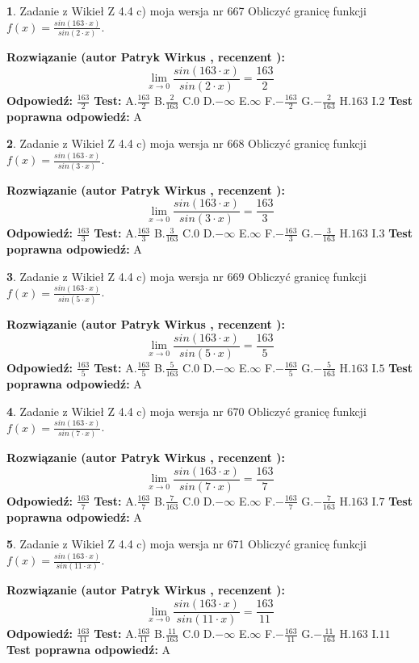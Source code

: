 \documentclass[12pt, a4paper]{article}
\theoremstyle{definition} %
\newtheorem{zad}{}
\newcommand{\zadStart}[1]{\begin{zad}#1\newline}
\newcommand{\zadStop}{\end{zad}}
\newcommand{\rozwStart}[2]{\noindent \textbf{Rozwiązanie (autor #1 , recenzent #2): }\newline}
\newcommand{\rozwStop}{\newline}
\newcommand{\odpStart}{\noindent \textbf{Odpowiedź:}\newline}
\newcommand{\odpStop}{\newline}
\newcommand{\testStart}{\noindent \textbf{Test:}\newline}
\newcommand{\testStop}{\newline}
\newcommand{\kluczStart}{\noindent \textbf{Test poprawna odpowiedź:}\newline}
\newcommand{\kluczStop}{\newline}
\begin{document}
\zadStart{Zadanie z Wikieł Z 4.4 c) moja wersja nr 667}
Obliczyć granicę funkcji $f(x)=\frac{sin(163\cdot x)}{sin(2\cdot x)}$.
\zadStop
\rozwStart{Patryk Wirkus}{}
$$\lim\limits_{x\to 0}\frac{sin(163\cdot x)}{sin(2\cdot x)}=
\frac{163}{2}$$
\rozwStop
\odpStart
$\frac{163}{2}$
\odpStop
\testStart
A.$\frac{163}{2}$
B.$\frac{2}{163}$
C.$0$
D.$-\infty$
E.$\infty$
F.$-\frac{163}{2}$
G.$-\frac{2}{163}$
H.$163$
I.$2$
\testStop
\kluczStart
A
\kluczStop



\zadStart{Zadanie z Wikieł Z 4.4 c) moja wersja nr 668}
Obliczyć granicę funkcji $f(x)=\frac{sin(163\cdot x)}{sin(3\cdot x)}$.
\zadStop
\rozwStart{Patryk Wirkus}{}
$$\lim\limits_{x\to 0}\frac{sin(163\cdot x)}{sin(3\cdot x)}=
\frac{163}{3}$$
\rozwStop
\odpStart
$\frac{163}{3}$
\odpStop
\testStart
A.$\frac{163}{3}$
B.$\frac{3}{163}$
C.$0$
D.$-\infty$
E.$\infty$
F.$-\frac{163}{3}$
G.$-\frac{3}{163}$
H.$163$
I.$3$
\testStop
\kluczStart
A
\kluczStop



\zadStart{Zadanie z Wikieł Z 4.4 c) moja wersja nr 669}
Obliczyć granicę funkcji $f(x)=\frac{sin(163\cdot x)}{sin(5\cdot x)}$.
\zadStop
\rozwStart{Patryk Wirkus}{}
$$\lim\limits_{x\to 0}\frac{sin(163\cdot x)}{sin(5\cdot x)}=
\frac{163}{5}$$
\rozwStop
\odpStart
$\frac{163}{5}$
\odpStop
\testStart
A.$\frac{163}{5}$
B.$\frac{5}{163}$
C.$0$
D.$-\infty$
E.$\infty$
F.$-\frac{163}{5}$
G.$-\frac{5}{163}$
H.$163$
I.$5$
\testStop
\kluczStart
A
\kluczStop



\zadStart{Zadanie z Wikieł Z 4.4 c) moja wersja nr 670}
Obliczyć granicę funkcji $f(x)=\frac{sin(163\cdot x)}{sin(7\cdot x)}$.
\zadStop
\rozwStart{Patryk Wirkus}{}
$$\lim\limits_{x\to 0}\frac{sin(163\cdot x)}{sin(7\cdot x)}=
\frac{163}{7}$$
\rozwStop
\odpStart
$\frac{163}{7}$
\odpStop
\testStart
A.$\frac{163}{7}$
B.$\frac{7}{163}$
C.$0$
D.$-\infty$
E.$\infty$
F.$-\frac{163}{7}$
G.$-\frac{7}{163}$
H.$163$
I.$7$
\testStop
\kluczStart
A
\kluczStop



\zadStart{Zadanie z Wikieł Z 4.4 c) moja wersja nr 671}
Obliczyć granicę funkcji $f(x)=\frac{sin(163\cdot x)}{sin(11\cdot x)}$.
\zadStop
\rozwStart{Patryk Wirkus}{}
$$\lim\limits_{x\to 0}\frac{sin(163\cdot x)}{sin(11\cdot x)}=
\frac{163}{11}$$
\rozwStop
\odpStart
$\frac{163}{11}$
\odpStop
\testStart
A.$\frac{163}{11}$
B.$\frac{11}{163}$
C.$0$
D.$-\infty$
E.$\infty$
F.$-\frac{163}{11}$
G.$-\frac{11}{163}$
H.$163$
I.$11$
\testStop
\kluczStart
A
\kluczStop
\end{document}
